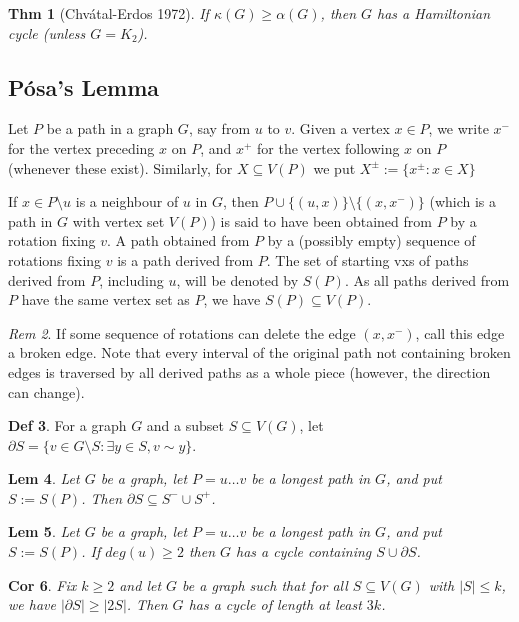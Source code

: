 \documentclass[11pt, fleqn, a4paper, landscape]{article}
\theoremstyle{plain} %
\newtheorem{thm}{Thm}
\newtheorem{lem}[thm]{Lem}
\newtheorem{cor}[thm]{Cor}
\theoremstyle{remark} %
\newtheorem{rem}[thm]{Rem}
\theoremstyle{definition} %
\newtheorem{defi}[thm]{Def}
\begin{document}
\begin{multicols}{5}
\begin{thm}[Chvátal-Erdos 1972]
If $\kappa (G)\ge\alpha(G)$, then $G$ has a Hamiltonian cycle (unless
$G = K_2$).
\end{thm}

\subsection{Pósa’s Lemma}
Let $P$ be a path in a graph $G$, say from $u$ to $v$. Given a vertex $x \in P$, we write $x^-$ for the vertex preceding $x$ on $P$, and $x^+$ for the vertex following $x$ on $P$ (whenever these exist). Similarly, for $X \subseteq V (P)$ we put $X^\pm:=\{x^\pm:x\in X\}$

If $x \in P\setminus u$ is a neighbour of $u$ in $G$, then $P \cup \{(u, x)\}\setminus\{(x, x^-)\}$ (which is a path in $G$ with vertex
set $V (P)$) is said to have been obtained from $P$ by a rotation fixing $v$. A path obtained from $P$ by a (possibly empty) sequence of rotations fixing $v$ is a path derived from $P$. The set of starting vxs of paths derived from $P$, including $u$, will be denoted by $S(P)$. As all paths derived from $P$ have the same vertex set as $P$, we have $S(P) \subseteq V (P)$.

\begin{rem}
If some sequence of rotations can delete the edge $(x, x^-)$, call this edge a broken edge. Note that every interval of the original path not containing broken edges is traversed by all derived paths as a whole piece (however, the direction can change).
\end{rem}

\begin{defi}
For a graph $G$ and a subset $S \subseteq V (G)$, let $\partial S = \{v \in G\setminus S : \exists y \in  S, v\sim y\}$.
\end{defi}

\begin{lem}
Let $G$ be a graph, let $P = u \dots v$ be a longest path in $G$, and put $S := S(P)$. Then $\partial S \subseteq S^- \cup  S^+$.
\end{lem}

\begin{lem}
Let $G$ be a graph, let $P = u \dots v$ be a longest path in $G$, and put $S := S(P)$. If $deg(u) \ge 2$ then $ G$ has a cycle containing $S \cup \partial S$.
\end{lem}

\begin{cor}
Fix $k \ge 2$ and let $G$ be a graph such that for all $S \subseteq V (G)$ with $|S|\le k$, we have $|\partial S|\ge |2S|$. Then $G$ has a cycle of length at least $3k$.
\end{cor}


\end{multicols}
\end{document}
